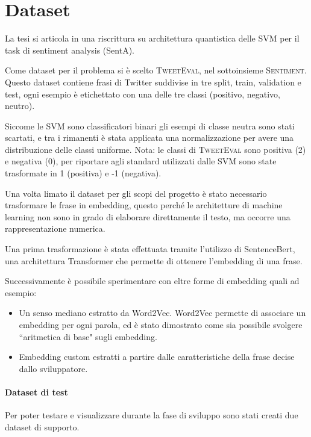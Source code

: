\documentclass[12pt]{article}
\begin{document}
\section{Dataset}

La tesi si articola in una riscrittura su architettura quantistica delle SVM per il task di sentiment analysis (SentA).

Come dataset per il problema si è scelto \textsc{TweetEval}, nel sottoinsieme \textsc{Sentiment}.
Questo dataset contiene frasi di Twitter suddivise in tre split, train, validation e test, 
ogni esempio è etichettato con una delle tre classi (positivo, negativo, neutro).

Siccome le SVM sono classificatori binari gli esempi di classe neutra sono stati scartati, 
e tra i rimanenti è stata applicata una normalizzazione per avere una distribuzione delle classi uniforme.
Nota: le classi di \textsc{TweetEval} sono positiva (2) e negativa (0), 
per riportare agli standard utilizzati dalle SVM sono state trasformate in 1 (positiva) e -1 (negativa).

Una volta limato il dataset per gli scopi del progetto è stato necessario trasformare le frase in embedding,
questo perché le architetture di machine learning non sono in grado di elaborare direttamente il testo, ma occorre una rappresentazione numerica.

Una prima trasformazione è stata effettuata tramite l'utilizzo di SentenceBert, 
una architettura Transformer che permette di ottenere l'embedding di una frase.

Successivamente è possibile sperimentare con eltre forme di embedding quali ad esempio:
\begin{itemize}
    \item Un senso mediano estratto da Word2Vec. Word2Vec permette di associare un embedding per ogni parola, ed è stato dimostrato come sia possibile svolgere “aritmetica di base" sugli embedding.
    \item Embedding custom estratti a partire dalle caratteristiche della frase decise dallo sviluppatore.
\end{itemize}

\paragraph{Dataset di test}
Per poter testare e visualizzare durante la fase di sviluppo sono stati creati due dataset di supporto.
\end{document}

